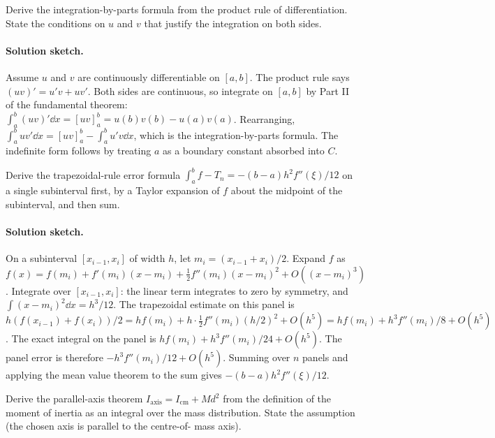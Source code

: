 \begin{exercise}
Derive the integration-by-parts formula from the product rule of
differentiation. State the conditions on $u$ and $v$ that justify
the integration on both sides.
\end{exercise}

\paragraph{Solution sketch.}
Assume $u$ and $v$ are continuously differentiable on $[a, b]$.
The product rule says $(uv)' = u'v + uv'$. Both sides are
continuous, so integrate on $[a, b]$ by Part II of the fundamental
theorem: $\int_{a}^{b}(uv)' \dd x = [uv]_{a}^{b} = u(b)v(b) -
u(a)v(a)$. Rearranging, $\int_{a}^{b} u v' \dd x = [uv]_{a}^{b}
- \int_{a}^{b} u' v \dd x$, which is the integration-by-parts
formula. The indefinite form follows by treating $a$ as a
boundary constant absorbed into $C$.

\begin{exercise}
Derive the trapezoidal-rule error formula
$\int_{a}^{b} f - T_{n} = -(b - a) h^{2} f''(\xi) / 12$ on a single
subinterval first, by a Taylor expansion of $f$ about the midpoint
of the subinterval, and then sum.
\end{exercise}

\paragraph{Solution sketch.}
On a subinterval $[x_{i-1}, x_{i}]$ of width $h$, let $m_{i} =
(x_{i-1} + x_{i})/2$. Expand $f$ as $f(x) = f(m_{i}) +
f'(m_{i})(x - m_{i}) + \tfrac{1}{2}f''(m_{i})(x - m_{i})^{2} +
O((x - m_{i})^{3})$. Integrate over $[x_{i-1}, x_{i}]$: the
linear term integrates to zero by symmetry, and $\int(x - m_{i})
^{2}\dd x = h^{3}/12$. The trapezoidal estimate on this panel is
$h(f(x_{i-1}) + f(x_{i}))/2 = h f(m_{i}) + h \cdot \tfrac{1}{2}
f''(m_{i})(h/2)^{2} + O(h^{5}) = h f(m_{i}) + h^{3}f''(m_{i})/8 +
O(h^{5})$. The exact integral on the panel is $h f(m_{i}) +
h^{3}f''(m_{i})/24 + O(h^{5})$. The panel error is therefore
$-h^{3}f''(m_{i})/12 + O(h^{5})$. Summing over $n$ panels and
applying the mean value theorem to the sum gives
$-(b-a)h^{2}f''(\xi)/12$.

\begin{exercise}
Derive the parallel-axis theorem
$I_{\mathrm{axis}} = I_{\mathrm{cm}} + M d^{2}$ from the definition
of the moment of inertia as an integral over the mass distribution.
State the assumption (the chosen axis is parallel to the centre-of-
mass axis).
\end{exercise}


